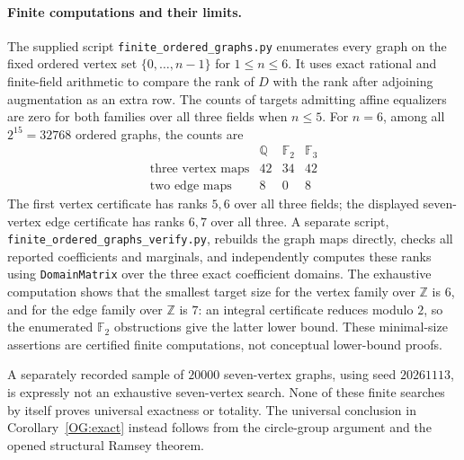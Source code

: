 \paragraph{Finite computations and their limits.}
The supplied script \texttt{finite\_ordered\_graphs.py} enumerates
every graph on the fixed ordered vertex set $\{0,\ldots,n-1\}$ for
$1\leq n\leq6$. It uses exact rational and finite-field arithmetic
to compare the rank of $D$ with the rank after adjoining augmentation
as an extra row. The counts of targets admitting affine equalizers
are zero for both families over all three fields when $n\leq5$.
For $n=6$, among all $2^{15}=32768$ ordered graphs, the counts are
\[
\begin{array}{c|rrr}
 &\mathbb Q&\mathbb F_2&\mathbb F_3\\\hline
 \text{three vertex maps}&42&34&42\\
 \text{two edge maps}&8&0&8
\end{array}
\]
The first vertex certificate has ranks $5,6$ over all three fields;
the displayed seven-vertex edge certificate has ranks $6,7$ over all
three. A separate script, \texttt{finite\_ordered\_graphs\_verify.py},
rebuilds the graph maps directly, checks all reported coefficients
and marginals, and independently computes these ranks using
\texttt{DomainMatrix} over the three exact coefficient domains.
The exhaustive computation shows that the smallest target size for
the vertex family over $\mathbb Z$ is $6$, and for the edge family
over $\mathbb Z$ is $7$: an integral certificate reduces modulo $2$,
so the enumerated $\mathbb F_2$ obstructions give the latter lower
bound. These minimal-size assertions are certified finite
computations, not conceptual lower-bound proofs.

A separately recorded sample of $20000$ seven-vertex graphs, using
seed $20261113$, is expressly not an exhaustive seven-vertex search.
None of these finite searches by itself proves universal exactness
or totality. The universal conclusion in Corollary~\ref{OG:exact}
instead follows from the circle-group argument and the opened
structural Ramsey theorem.
